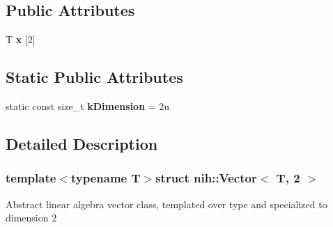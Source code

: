 \subsection*{\-Public \-Attributes}
\begin{DoxyCompactItemize}
\item 
\hypertarget{structnih_1_1_vector_3_01_t_00_012_01_4_a5193a1b952438127ffde5019e964907d}{
\-T {\bfseries x} \mbox{[}2\mbox{]}}
\label{structnih_1_1_vector_3_01_t_00_012_01_4_a5193a1b952438127ffde5019e964907d}

\end{DoxyCompactItemize}
\subsection*{\-Static \-Public \-Attributes}
\begin{DoxyCompactItemize}
\item 
\hypertarget{structnih_1_1_vector_3_01_t_00_012_01_4_ae1116de9f3ba6c22e64d50586ad9a39c}{
static const size\-\_\-t {\bfseries k\-Dimension} = 2u}
\label{structnih_1_1_vector_3_01_t_00_012_01_4_ae1116de9f3ba6c22e64d50586ad9a39c}

\end{DoxyCompactItemize}


\subsection{\-Detailed \-Description}
\subsubsection*{template$<$typename T$>$struct nih\-::\-Vector$<$ T, 2 $>$}

\-Abstract linear algebra vector class, templated over type and specialized to dimension 2 

